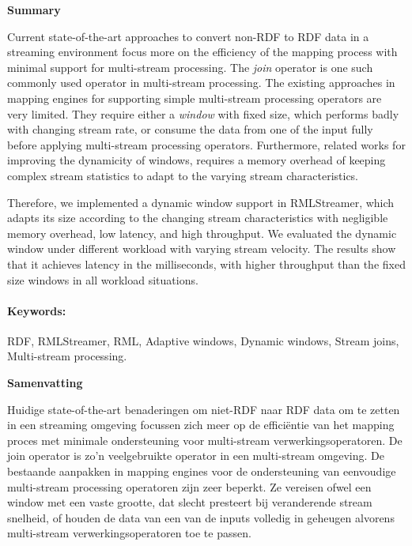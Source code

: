 \newpage
{}
{}
\noindent \textbf{\huge Summary}

\vspace{1.5cm}
Current state-of-the-art approaches to convert non-RDF to RDF data in 
a streaming environment focus more on the efficiency of the 
mapping process with minimal support for multi-stream processing. 
The \emph{join} operator is one such commonly used operator in multi-stream processing. 
The existing approaches in mapping engines for supporting simple multi-stream processing operators
are very limited.
They require either a \emph{window} with fixed size, which performs badly with 
changing stream rate, or consume the data from 
one of the input fully before applying multi-stream processing operators.
Furthermore, related works for improving the dynamicity of windows, 
requires a memory overhead of keeping complex stream statistics to adapt 
to the varying stream characteristics.

Therefore, we implemented a dynamic window support in RMLStreamer, which 
adapts its size according to the changing stream characteristics with
negligible memory overhead, low latency, and high throughput. We evaluated the dynamic window
under different workload with varying stream velocity. The results 
show that it achieves latency in the milliseconds, with higher 
throughput than the fixed size windows in all workload situations. 

\paragraph{Keywords:}

RDF, RMLStreamer, RML, Adaptive windows, Dynamic windows,
Stream joins, Multi-stream processing.


\newpage
\noindent \textbf{\huge Samenvatting}

\vspace{1.5cm}
Huidige state-of-the-art benaderingen om niet-RDF naar RDF data om te zetten
in een streaming omgeving focussen zich meer op de efficiëntie van het 
mapping proces met minimale ondersteuning voor multi-stream verwerkingsoperatoren.
De join operator is zo'n veelgebruikte operator in een multi-stream omgeving.
De bestaande aanpakken in mapping engines voor de ondersteuning van 
eenvoudige multi-stream processing operatoren zijn zeer beperkt.
Ze vereisen ofwel een window met een vaste grootte, dat slecht presteert bij 
veranderende stream snelheid, of houden de data van een van de inputs 
volledig in geheugen alvorens multi-stream verwerkingsoperatoren toe te passen.

